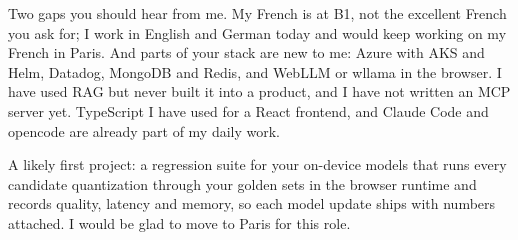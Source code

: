 {	Two gaps you should hear from me. My French is at B1, not the excellent French you ask for; I work in English and German today and would keep working on my French in Paris. And parts of your stack are new to me: Azure with AKS and Helm, Datadog, MongoDB and Redis, and WebLLM or wllama in the browser. I have used RAG but never built it into a product, and I have not written an MCP server yet. TypeScript I have used for a React frontend, and Claude Code and opencode are already part of my daily work.

	A likely first project: a regression suite for your on-device models that runs every candidate quantization through your golden sets in the browser runtime and records quality, latency and memory, so each model update ships with numbers attached. I would be glad to move to Paris for this role.

}
